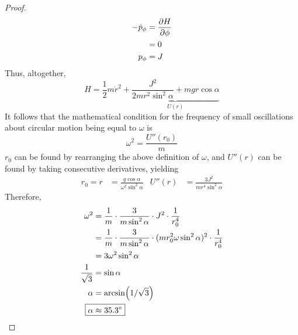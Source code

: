 \documentclass[../psets.tex]{subfiles}
\begin{document}
\begin{enumerate}
\begin{proof}
\begin{align*}
            -\dot{p}_\phi &= \pdv{H}{\phi}\\
            &= 0\\
            p_\phi &= J
        \end{align*}
        Thus, altogether,
        \begin{equation*}
            H = \frac{1}{2}m\dot{r}^2+\underbrace{\frac{J^2}{2mr^2\sin^2\alpha}+mgr\cos\alpha}_{U(r)}
        \end{equation*}
        It follows that the mathematical condition for the frequency of small oscillations about circular motion being equal to $\omega$ is
        \begin{equation*}
            \omega^2 = \frac{U''(r_0)}{m}
        \end{equation*}
        $r_0$ can be found by rearranging the above definition of $\omega$, and $U''(r)$ can be found by taking consecutive derivatives, yielding
        \begin{align*}
            r_0 = r &= \frac{g\cos\alpha}{\omega^2\sin^2\alpha}&
            U''(r) &= \frac{3J^2}{mr^4\sin^2\alpha}
        \end{align*}
        Therefore,
        \begin{align*}
            \omega^2 &= \frac{1}{m}\cdot\frac{3}{m\sin^2\alpha}\cdot J^2\cdot\frac{1}{r_0^4}\\
            &= \frac{1}{m}\cdot\frac{3}{m\sin^2\alpha}\cdot(mr_0^2\omega\sin^2\alpha)^2\cdot\frac{1}{r_0^4}\\
            &= 3\omega^2\sin^2\alpha\\
            \frac{1}{\sqrt{3}} &= \sin\alpha\\
            \alpha &= \arcsin(1/\sqrt{3})\\
            \Aboxed{\alpha &\approx \ang{35.3}}
        \end{align*}
    \end{proof}

\end{enumerate}
\end{document}
